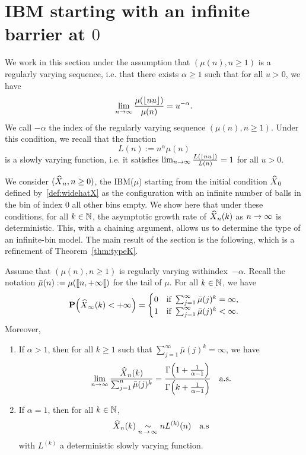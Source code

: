 \documentclass[AHL,Unicode,longabstracts,published]{cedram}
\newcommand{\bbN}{\mathbb{N}}
\newcommand{\floor}[1]{{\left\lfloor #1 \right\rfloor}}
\renewcommand{\P}{\mathbf{P}}
\let\originalleft\left
\let\originalright\right
\renewcommand{\left}{\mathopen{}\mathclose\bgroup\originalleft}
\renewcommand{\right}{\aftergroup\egroup\originalright}
\let\oldin\in
\renewcommand{\in}{\mathchoice{\oldin}{\oldin}{\,\oldin\,}{\,\oldin\,}}
\renewcommand*{\to}{\mathchoice{\longrightarrow}{\rightarrow}{\rightarrow}{\rightarrow}}
\let\oldhat\hat
\renewcommand*{\hat}[1]{\mathchoice{\widehat{#1}}{\widehat{#1}}{\oldhat{#1}}{\oldhat{#1}}}
\newcommand{\llbracket}{\mathopen{[\mkern -2.7mu[}}
\newcommand{\llb}{\llbracket}
\begin{document}
\section{IBM starting with an infinite barrier at \texorpdfstring{$0$}{0}}\label{sec:typeK}


We work in this section under the assumption that $(\mu(n), n \geq 1)$ is a regularly varying sequence, i.e. that there exists $\alpha \geq 1$ such that for all $u > 0$, we have
\begin{equation}\label{eqn:muRegularlyVarying}
\lim_{n \to \infty} \frac{\mu(\floor{n u})}{\mu(n)} = u^{-\alpha}.
\end{equation}
We call $-\alpha$ the index of the regularly varying sequence $(\mu(n), n \geq 1)$. Under this condition, we recall that the function
\begin{equation}\label{eqn:slowlyVarying}
L(n)
:= n^{\alpha} \mu(n)
\end{equation}
is a slowly varying function, i.e. it satisfies $\lim_{n \to \infty} \frac{L(\floor{n u})}{L(n)} = 1$ for all $u > 0$.

We consider $(\hat{X}_n, n \geq 0)$, the IBM($\mu$) starting from the initial condition $\hat{X}_0$ defined by~\eqref{def:widehatX} as the configuration with an infinite number of balls in the bin of index $0$ all other bins empty. We show here that under these conditions, for all $k \in \bbN$, the asymptotic growth rate of $\hat{X}_n(k)$ as $n \to \infty$ is deterministic. This, with a chaining argument, allows us to determine the type of an infinite-bin model. The main result of the section is the following, which is a refinement of Theorem~\ref{thm:typeK}.
\begin{prop}\label{prop:laProp}
Assume that $(\mu(n), n \geq 1)$ is regularly varying with\linebreak index~$-\alpha$. Recall the notation $\bar{\mu}(n)
:= \mu(\llb n,+\infty\llb )$ for the tail of $\mu$. For all $k \in \bbN$, we have
\[
\P\Big(\hat{X}_\infty(k) < +\infty\Big) =
\begin{cases}
0 & \text{if }\sum_{j = 1}^\infty \bar{\mu}(j)^k = \infty,\\
1 & \text{if }\sum_{j = 1}^\infty \bar{\mu}(j)^k < \infty.
\end{cases}
\]
Moreover,
\begin{enumerate}
\item If $\alpha > 1$, then for all $k\geq 1$ such that $\sum_{j = 1}^\infty \bar{\mu}(j)^k = \infty$, we have
\begin{equation*}
\lim_{n \to \infty} \frac{\hat{X}_n(k)}{\sum_{j=1}^n \bar{\mu}(j)^k} = \frac{\Gamma\left(1 + \frac{1}{\alpha - 1}\right)}{\Gamma\left(k + \frac{1}{\alpha -1} \right)} \quad \text{a.s.}
\end{equation*}
\item If $\alpha = 1$, then for all $k \in \bbN$,
\[
\hat{X}_n(k) \underset{n\,\to\,\infty}{\sim} nL^{(k)}(n) \quad \text{a.s}
\]
with $L^{(k)}$ a deterministic slowly varying function.
\end{enumerate}
\end{prop}
\end{document}
